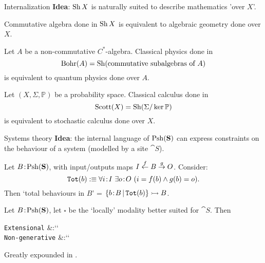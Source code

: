 \begin{frame}{Internalization}
	\textbf{Idea}: $\operatorname{Sh} X$ is naturally suited to describe mathematics 'over $X$'.

	\begin{example}
		Commutative algebra done in $\operatorname{Sh} X$ is equivalent to algebraic geometry done over $X$.
	\end{example}
	\begin{example}
		Let $A$ be a non-commutative $C^*$-algebra.
		Classical physics done in
		\begin{equation*}
			\operatorname{Bohr}(A) = \operatorname{Sh}(\text{commutative subalgebras of $A$})
		\end{equation*}
		is equivalent to quantum physics done over $A$.
	\end{example}
	\begin{example}
		Let $(X,\Sigma, \mathbb P)$ be a probability space. Classical calculus done in
		\begin{equation*}
			\operatorname{Scott}(X) = \operatorname{Sh} (\Sigma / \ker \mathbb{P})
		\end{equation*}
		is equivalent to stochastic calculus done over $X$. 
	\end{example}
\end{frame}

\begin{frame}{Systems theory}
	\textbf{Idea}: the internal language of $\operatorname{Psh}(\mathbf{S})$ can express constraints on the behaviour of a system (modelled by a site $\cat S$).

	\begin{example}
		Let $B \!:\! \operatorname{Psh}(\mathbf{S})$, with input/outputs maps $I \overset{f}{\leftarrow} B \overset{g}{\to} O$. Consider:
		\begin{equation*}
			\texttt{Tot}(b) :\equiv \forall i \!:\! I\ \exists o \!:\! O\ (i = f(b) \land g(b) = o).
		\end{equation*}
		Then `total behaviours in $B$' = $\{ b \!:\! B \,|\, \texttt{Tot}(b)\} \rightarrowtail B$.
	\end{example}
	\begin{example}
		Let $B \!:\! \operatorname{Psh} (\mathbf{S})$, let $\square$ be the `locally' modality better suited for $\cat S$. Then
		\begin{eqalign*}
			\texttt{Extensional} &:\equiv ``\\
			\texttt{Non-generative} &:\equiv ``
		\end{eqalign*}
	\end{example}
	Greatly expounded in \cite{schultz2019temporal}.
\end{frame}
